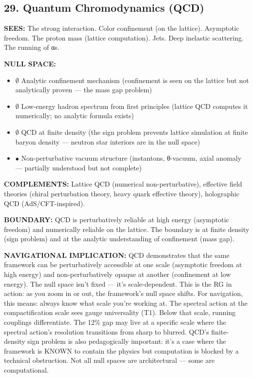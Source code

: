 \bigskip\noindent\makebox[\textwidth]{\color{rulegray}\rule{5cm}{0.3pt}}\bigskip


\subsection*{29. Quantum Chromodynamics (QCD)}


\textbf{SEES:} The strong interaction. Color confinement (on the lattice). Asymptotic freedom. The proton mass (lattice computation). Jets. Deep inelastic scattering. The running of αs.


\textbf{NULL SPACE:}

\begin{itemize}[nosep,leftmargin=*]
  \item $\emptyset$ Analytic confinement mechanism (confinement is seen on the lattice but not analytically proven — the mass gap problem)
  \item $\emptyset$ Low-energy hadron spectrum from first principles (lattice QCD computes it numerically; no analytic formula exists)
  \item $\emptyset$ QCD at finite density (the sign problem prevents lattice simulation at finite baryon density — neutron star interiors are in the null space)
  \item $\bullet$ Non-perturbative vacuum structure (instantons, θ-vacuum, axial anomaly — partially understood but not complete)
\end{itemize}


\textbf{COMPLEMENTS:} Lattice QCD (numerical non-perturbative), effective field theories (chiral perturbation theory, heavy quark effective theory), holographic QCD (AdS/\allowbreak CFT-inspired).


\textbf{BOUNDARY:} QCD is perturbatively reliable at high energy (asymptotic freedom) and numerically reliable on the lattice. The boundary is at finite density (sign problem) and at the analytic understanding of confinement (mass gap).


\textbf{NAVIGATIONAL IMPLICATION:} QCD demonstrates that the same framework can be perturbatively accessible at one scale (asymptotic freedom at high energy) and non-perturbatively opaque at another (confinement at low energy). The null space isn't fixed — it's scale-dependent. This is the RG in action: as you zoom in or out, the framework's null space shifts. For navigation, this means: always know what scale you're working at. The spectral action at the compactification scale sees gauge universality (T1). Below that scale, running couplings differentiate. The 12\% gap may live at a specific scale where the spectral action's resolution transitions from sharp to blurred. QCD's finite-density sign problem is also pedagogically important: it's a case where the framework is KNOWN to contain the physics but computation is blocked by a technical obstruction. Not all null spaces are architectural — some are computational.


